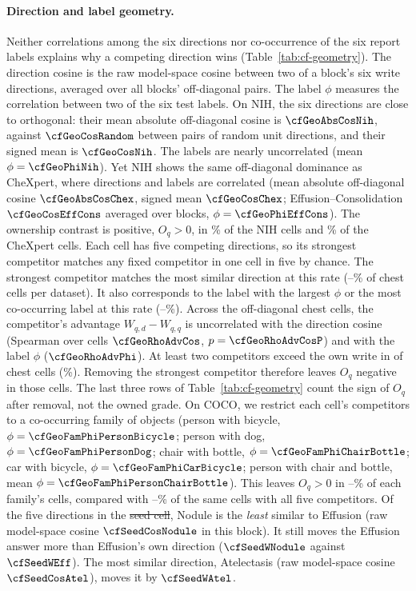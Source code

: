\documentclass{article}
\makeatletter
\providecommand{\DIFaddtex}[1]{{\protect\color{blue}\uwave{#1}}} %
\providecommand{\DIFdeltex}[1]{{\protect\color{red}\sout{#1}}} %
\providecommand{\DIFaddbegin}{} %
\providecommand{\DIFaddend}{} %
\providecommand{\DIFdelbegin}{} %
\providecommand{\DIFdelend}{} %
\providecommand{\DIFadd}[1]{\texorpdfstring{\DIFaddtex{#1}}{#1}} %
\providecommand{\DIFdel}[1]{\texorpdfstring{\DIFdeltex{#1}}{}} %
\providecommand{\DIFscaledelfig}{0.5}
\newlength{\DIFdelgraphicswidth} %
\newlength{\DIFdelgraphicsheight} %
\providecommand{\DIFaddincludegraphics}[2][]{{\color{blue}\fbox{\DIFOincludegraphics[#1]{#2}}}} %
\providecommand{\DIFdelincludegraphics}[2][]{%
\sbox{\DIFdelgraphicsbox}{\DIFOincludegraphics[#1]{#2}}%
\settoboxwidth{\DIFdelgraphicswidth}{\DIFdelgraphicsbox} %
\settoboxtotalheight{\DIFdelgraphicsheight}{\DIFdelgraphicsbox} %
\scalebox{\DIFscaledelfig}{%
\parbox[b]{\DIFdelgraphicswidth}{\usebox{\DIFdelgraphicsbox}\\[-\baselineskip] \rule{\DIFdelgraphicswidth}{0em}}\llap{\resizebox{\DIFdelgraphicswidth}{\DIFdelgraphicsheight}{%
\setlength{\unitlength}{\DIFdelgraphicswidth}%
\begin{picture}(1,1)%
\thicklines\linethickness{2pt} %
{\color[rgb]{1,0,0}\put(0,0){\framebox(1,1){}}}%
{\color[rgb]{1,0,0}\put(0,0){\line( 1,1){1}}}%
{\color[rgb]{1,0,0}\put(0,1){\line(1,-1){1}}}%
\end{picture}%
}\hspace*{3pt}}} %
} %
\DeclareRobustCommand{\DIFaddbegin}{\DIFOaddbegin \let\includegraphics\DIFaddincludegraphics} %
\DeclareRobustCommand{\DIFaddend}{\DIFOaddend \let\includegraphics\DIFOincludegraphics} %
\DeclareRobustCommand{\DIFdelbegin}{\DIFOdelbegin \let\includegraphics\DIFdelincludegraphics} %
\DeclareRobustCommand{\DIFdelend}{\DIFOaddend \let\includegraphics\DIFOincludegraphics} %
\let\sout@orig\sout %
\renewcommand{\sout}[1]{\ifmmode\text{\sout@orig{\ensuremath{#1}}}\else\sout@orig{#1}\fi} %
\makeatother
\begin{document}
\paragraph{Direction and label geometry.} Neither correlations among the six directions nor co-occurrence of the six report labels explains why a competing direction wins (Table~\ref{tab:cf-geometry}). The direction cosine is the raw model-space cosine between two of a block's six write directions, averaged over all blocks' off-diagonal pairs. The label $\phi$ measures the correlation between two of the six test labels. On NIH, the six directions are close to orthogonal: their mean absolute off-diagonal cosine is $\cfGeoAbsCosNih$, against $\cfGeoCosRandom$ between pairs of random unit directions, and their signed mean is $\cfGeoCosNih$. The labels are nearly uncorrelated (mean $\phi=\cfGeoPhiNih$). Yet NIH shows the same off-diagonal dominance as CheXpert, where directions and labels are correlated (mean absolute off-diagonal cosine $\cfGeoAbsCosChex$, signed mean $\cfGeoCosChex$; Effusion--Consolidation $\cfGeoCosEffCons$ averaged over blocks, $\phi=\cfGeoPhiEffCons$). The ownership contrast is positive, $O_q>0$, in \cfGeoOwnWinsNihPct\% of the \cfNihCells{} NIH cells and \cfGeoOwnWinsChexPct\% of the \cfChexCells{} CheXpert cells. Each cell has five competing directions, so its strongest competitor matches any fixed competitor in one cell in five by chance. The strongest competitor matches the most similar direction at this rate (\cfGeoChanceCosMin{}--\cfGeoChanceCosMax\% of chest cells per dataset). It also corresponds to the label with the largest $\phi$ or the most co-occurring label at this rate (\cfGeoChanceLabelMin{}--\cfGeoChanceLabelMax\%). Across the \cfGeoOffdiagCells{} off-diagonal chest cells, the competitor's advantage $W_{q,d}-W_{q,q}$ is uncorrelated with the direction cosine (Spearman over cells $\cfGeoRhoAdvCos$, $p=\cfGeoRhoAdvCosP$) and with the label $\phi$ ($\cfGeoRhoAdvPhi$). At least two competitors exceed the own write in \cfGeoTwoAbove{} of \cfGeoTwoAboveN{} chest cells (\cfGeoTwoAbovePct\%). Removing the strongest competitor therefore leaves $O_q$ negative in those cells. The last three rows of Table~\ref{tab:cf-geometry} count the sign of $O_q$ after removal, not the owned grade. On COCO, we restrict each cell's competitors to a co-occurring family of objects (person with bicycle, $\phi=\cfGeoFamPhiPersonBicycle$; person with dog, $\phi=\cfGeoFamPhiPersonDog$; chair with bottle, $\phi=\cfGeoFamPhiChairBottle$; car with bicycle, $\phi=\cfGeoFamPhiCarBicycle$; person with chair and bottle, mean $\phi=\cfGeoFamPhiPersonChairBottle$). This leaves $O_q>0$ in \cfGeoCocoFamMinPct{}--\cfGeoCocoFamMaxPct\% of each family's cells, compared with \cfGeoCocoFamFullMinPct{}--\cfGeoCocoFamFullMaxPct\% of the same cells with all five competitors. Of the five directions in the \DIFdelbegin \DIFdel{seed cell}\DIFdelend \DIFaddbegin \DIFadd{Effusion case}\DIFaddend , Nodule is the \emph{least} similar to Effusion (raw model-space cosine $\cfSeedCosNodule$ in this block). It still moves the Effusion answer more than Effusion's own direction ($\cfSeedWNodule$ against $\cfSeedWEff$). The most similar direction, Atelectasis (raw model-space cosine $\cfSeedCosAtel$), moves it by $\cfSeedWAtel$.
\end{document}

